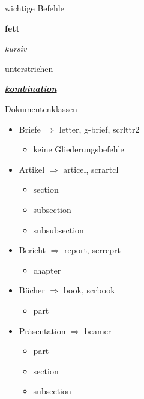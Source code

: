 \begin{frame}{wichtige Befehle}
	
	\begin{block} {\textbf{fett}}
	  
	 \end{block}
	\begin{block}{\textit{kursiv}}
		
	\end{block}  
	\begin{block}{\underline{unterstrichen}}
		
	\end{block} 
	\begin{block}{\textbf{\textit{\underline{kombination}}}}
		 
	\end{block} 
	
\end{frame}

\begin{frame}{Dokumentenklassen}
	\begin{itemize}
		\item Briefe $ \Rightarrow $ letter, g-brief, scrlttr2
			\begin{itemize}
				\item keine Gliederungsbefehle
			\end{itemize}
		\item Artikel $ \Rightarrow $ articel, scrartcl
			\begin{itemize}
				\item section
				\item subsection
				\item subsubsection
			\end{itemize}
		\item Bericht $ \Rightarrow $ report, scrreprt
			\begin{itemize}
				\item chapter
			\end{itemize}
		\item Bücher $ \Rightarrow $ book, scrbook
			\begin{itemize}
				\item part
			\end{itemize}
		\item Präsentation $ \Rightarrow $ beamer
			\begin{itemize}
				\item part
				\item section
				\item subsection
			\end{itemize}
	\end{itemize}
\end{frame}

